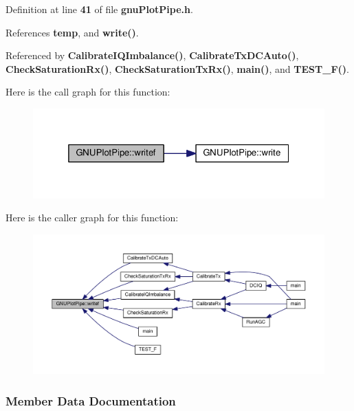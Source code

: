 Definition at line {\bf 41} of file {\bf gnu\+Plot\+Pipe.\+h}.



References {\bf temp}, and {\bf write()}.



Referenced by {\bf Calibrate\+I\+Q\+Imbalance()}, {\bf Calibrate\+Tx\+D\+C\+Auto()}, {\bf Check\+Saturation\+Rx()}, {\bf Check\+Saturation\+Tx\+Rx()}, {\bf main()}, and {\bf T\+E\+S\+T\+\_\+\+F()}.



Here is the call graph for this function\+:
\nopagebreak
\begin{figure}[H]
\begin{center}
\leavevmode
\includegraphics[width=325pt]{d4/d5e/classGNUPlotPipe_a8f126204cc3c4df3f8e69e229285ef0b_cgraph}
\end{center}
\end{figure}




Here is the caller graph for this function\+:
\nopagebreak
\begin{figure}[H]
\begin{center}
\leavevmode
\includegraphics[width=350pt]{d4/d5e/classGNUPlotPipe_a8f126204cc3c4df3f8e69e229285ef0b_icgraph}
\end{center}
\end{figure}




\subsubsection{Member Data Documentation}
